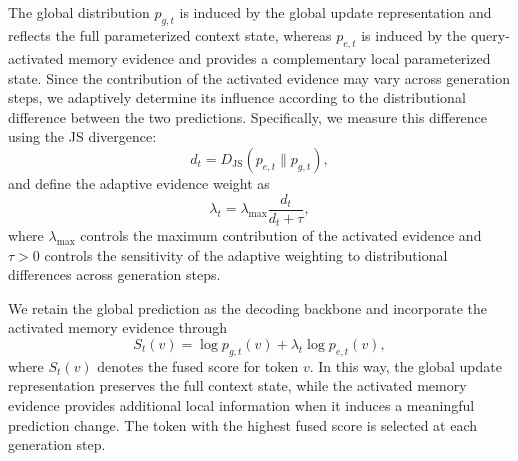 

\subsection{\amd{}}
\label{sec:adaptive_evidence_decoding}

The global distribution $p_{g,t}$ is induced by the global update representation and reflects the full parameterized context state, whereas $p_{e,t}$ is induced by the query-activated memory evidence and provides a complementary local parameterized state. Since the contribution of the activated evidence may vary across generation steps, we adaptively determine its influence according to the distributional difference between the two predictions. Specifically, we measure this difference using the JS divergence:
\begin{equation}
d_t = D_{\mathrm{JS}}\left(p_{e,t}\parallel p_{g,t}\right),
\label{eq:js-divergence}
\end{equation}
and define the adaptive evidence weight as
\begin{equation}
\lambda_t = \lambda_{\max}\frac{d_t}{d_t+\tau},
\label{eq:adaptive_gate}
\end{equation}
where $\lambda_{\max}$ controls the maximum contribution of the activated evidence and $\tau>0$ controls the sensitivity of the adaptive weighting to distributional differences across generation steps.

We retain the global prediction as the decoding backbone and incorporate the activated memory evidence through
\begin{equation}
S_t(v) = \log p_{g,t}(v) + \lambda_t\log p_{e,t}(v),
\label{eq:fusion-score}
\end{equation}
where $S_t(v)$ denotes the fused score for token $v$. In this way, the global update representation preserves the full context state, while the activated memory evidence provides additional local information when it induces a meaningful prediction change. The token with the highest fused score is selected at each generation step.
